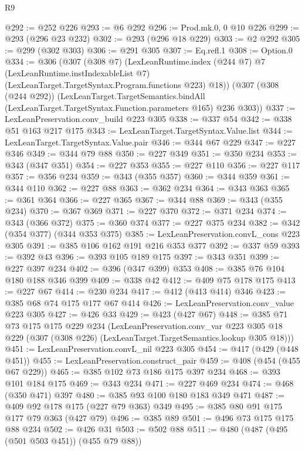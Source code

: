 \begin{lexlean}{R9}
\begin{coremodule}
{{{{{@292 := @252 @226
@293 := @6 @292
@296 := Prod.mk.{0, 0} @10 @226
@299 := @293 (@296 @23 @232)
@302 := @293 (@296 @18 @229)
@303 := @2 @292
@305 := @299 (@302 @303)
@306 := @291 @305
@307 := Eq.refl.{1}
@308 := Option.{0}
@334 := @306
    (@307
      (@308 @7)
      (LexLeanRuntime.index
        (@244 @7)
        @7
        (LexLeanRuntime.instIndexableList @7)
        (LexLeanTarget.TargetSyntax.Program.functions @223)
        @18))
    (@307
      (@308 (@244 @292))
      (LexLeanTarget.TargetSemantics.bindAll
        (LexLeanTarget.TargetSyntax.Function.parameters @165)
        @236
        @303))
@337 := LexLeanPreservation.conv_build @223 @305
@338 := @337 @54
@342 := @338 @51 @163 @217 @175
@343 := LexLeanTarget.TargetSyntax.Value.list
@344 := LexLeanTarget.TargetSyntax.Value.pair
@346 := @344 @67 @229
@347 := @227 @346
@349 := @344 @79 @88
@350 := @227 @349
@351 := @350 @234
@353 := @343 (@347 @351)
@354 := @227 @353
@355 := @227 @110
@356 := @227 @117
@357 := @356 @234
@359 := @343 (@355 @357)
@360 := @344 @359
@361 := @344 @110
@362 := @227 @88
@363 := @362 @234
@364 := @343 @363
@365 := @361 @364
@366 := @227 @365
@367 := @344 @88
@369 := @343 (@355 @234)
@370 := @367 @369
@371 := @227 @370
@372 := @371 @234
@374 := @343 (@366 @372)
@375 := @360 @374
@377 := @227 @375 @234
@382 := @342 (@354 @377) (@344 @353 @375)
@385 := LexLeanPreservation.convL_cons @223 @305
@391 := @385 @106 @162 @191 @216 @353 @377
@392 := @337 @59
@393 := @392 @43
@396 := @393 @105 @189 @175
@397 := @343 @351
@399 := @227 @397 @234
@402 := @396 (@347 @399) @353
@408 := @385 @76 @104 @180 @188 @346 @399
@409 := @338 @42
@412 := @409 @75 @178 @175
@413 := @227 @67
@414 := @230 @234
@417 := @412 (@413 @414) @346
@423 := @385 @68 @74 @175 @177 @67 @414
@426 := LexLeanPreservation.conv_value @223 @305
@427 := @426 @33
@429 := @423 (@427 @67)
@448 := @385
    @71
    @73
    @175
    @175
    @229
    @234
    (LexLeanPreservation.conv_var
      @223
      @305
      @18
      @229
      (@307 (@308 @226) (LexLeanTarget.TargetSemantics.lookup @305 @18)))
@451 := LexLeanPreservation.convL_nil @223 @305
@454 := @417 (@429 (@448 @451))
@455 := LexLeanPreservation.construct_pair
@459 := @408 (@454 (@455 @67 @229))
@465 := @385 @102 @73 @186 @175 @397 @234
@468 := @393 @101 @184 @175
@469 := @343 @234
@471 := @227 @469 @234
@474 := @468 (@350 @471) @397
@480 := @385 @93 @100 @180 @183 @349 @471
@487 := @409 @92 @178 @175 (@227 @79 @363) @349
@495 := @385 @80 @91 @175 @177 @79 @363 (@427 @79)
@496 := @385 @89
@501 := @496 @73 @175 @175 @88 @234
@502 := @426 @31
@503 := @502 @88
@511 := @480 (@487 (@495 (@501 @503 @451)) (@455 @79 @88))
}}}}}
\end{coremodule}
\end{lexlean}
